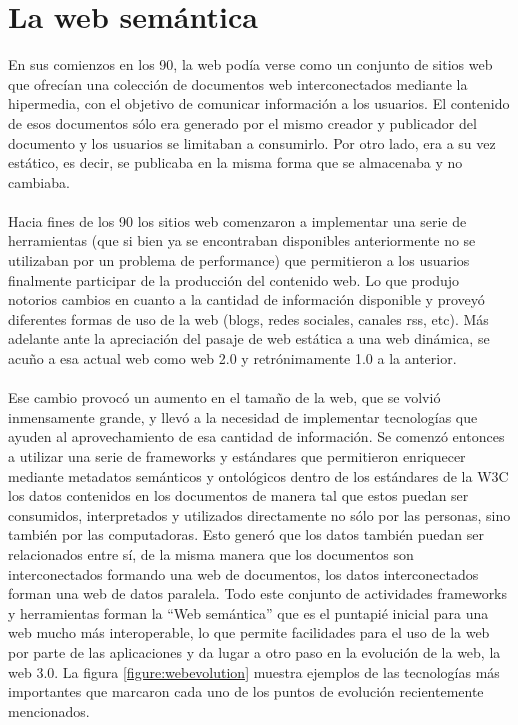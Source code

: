 \section{La web semántica}
\label{section:la-web-semantica}
En sus comienzos en los 90, la web podía verse como un conjunto de sitios web que ofrecían una colección de documentos web interconectados mediante la hipermedia, con el objetivo de comunicar información a los usuarios.
El contenido de esos documentos sólo era generado por el mismo creador y publicador del documento y los usuarios se limitaban a consumirlo. Por otro lado, era a su vez estático, es decir, se publicaba en la misma forma que se almacenaba y no cambiaba.  
\\\\
Hacia fines de los 90 los sitios web comenzaron a implementar una serie de herramientas (que si bien ya se encontraban disponibles anteriormente no se utilizaban por un problema de performance) que permitieron a los usuarios finalmente participar de la producción del contenido web. Lo que produjo notorios cambios en cuanto a la cantidad de información disponible y proveyó diferentes formas de uso de la web (blogs, redes sociales, canales rss, etc). Más adelante ante la apreciación del pasaje de web estática a una web dinámica, se acuño a esa actual web como web 2.0 y retrónimamente 1.0 a la anterior.
\\\\
Ese cambio provocó un aumento en el tamaño de la web, que se volvió inmensamente grande, y llevó a la necesidad de implementar tecnologías que ayuden al aprovechamiento de esa cantidad de información. 
Se comenzó entonces a utilizar una serie de frameworks y estándares que permitieron enriquecer mediante metadatos semánticos y ontológicos dentro de los estándares de la W3C los datos contenidos en los documentos de manera tal que estos puedan ser consumidos, interpretados y utilizados directamente no sólo por las personas, sino también por las computadoras.
Esto generó que los datos también puedan ser relacionados entre sí, de la misma manera que los documentos son interconectados formando una web de documentos, los datos interconectados forman una web de datos paralela\cite{DiNoia2012}.
Todo este conjunto de actividades frameworks y herramientas forman la ``Web semántica'' que es el puntapié inicial para una web mucho más interoperable, lo que permite facilidades para el uso de la web por parte de las aplicaciones y da lugar a otro paso en la evolución de la web, la web 3.0. 
La figura \ref{figure:webevolution} muestra ejemplos de las tecnologías más importantes que marcaron cada uno de los puntos de evolución recientemente mencionados.

